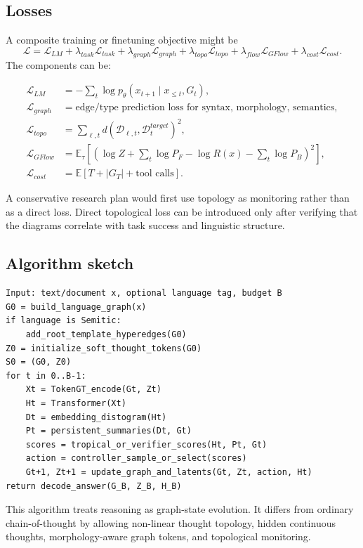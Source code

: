 \documentclass[11pt]{article}
\newcommand{\E}{\mathbb{E}}
\newcommand{\1}{\mathbf{1}}
\begin{document}
\subsection{Losses}

A composite training or finetuning objective might be
\[
\mathcal{L}=\mathcal{L}_{LM}+\lambda_{task}\mathcal{L}_{task}+\lambda_{graph}\mathcal{L}_{graph}+\lambda_{topo}\mathcal{L}_{topo}+\lambda_{flow}\mathcal{L}_{GFlow}+\lambda_{cost}\mathcal{L}_{cost}.
\]
The components can be:

\begin{align*}
\mathcal{L}_{LM} &= -\sum_t \log p_\theta(x_{t+1}\mid x_{\le t},G_t),\\
\mathcal{L}_{graph} &= \text{edge/type prediction loss for syntax, morphology, semantics},\\
\mathcal{L}_{topo} &= \sum_{\ell,t} d(\mathcal{D}_{\ell,t},\mathcal{D}^{target}_{t})^2,\\
\mathcal{L}_{GFlow} &= \E_\tau\left[\left(\log Z+\sum_t\log P_F-\log R(x)-\sum_t\log P_B\right)^2\right],\\
\mathcal{L}_{cost} &= \E[T+|G_T|+\text{tool calls}].
\end{align*}

A conservative research plan would first use topology as monitoring rather than as a direct loss. Direct topological loss can be introduced only after verifying that the diagrams correlate with task success and linguistic structure.

\subsection{Algorithm sketch}

\begin{lstlisting}
Input: text/document x, optional language tag, budget B
G0 = build_language_graph(x)
if language is Semitic:
    add_root_template_hyperedges(G0)
Z0 = initialize_soft_thought_tokens(G0)
S0 = (G0, Z0)
for t in 0..B-1:
    Xt = TokenGT_encode(Gt, Zt)
    Ht = Transformer(Xt)
    Dt = embedding_distogram(Ht)
    Pt = persistent_summaries(Dt, Gt)
    scores = tropical_or_verifier_scores(Ht, Pt, Gt)
    action = controller_sample_or_select(scores)
    Gt+1, Zt+1 = update_graph_and_latents(Gt, Zt, action, Ht)
return decode_answer(G_B, Z_B, H_B)
\end{lstlisting}

This algorithm treats reasoning as graph-state evolution. It differs from ordinary chain-of-thought by allowing non-linear thought topology, hidden continuous thoughts, morphology-aware graph tokens, and topological monitoring.
\end{document}
